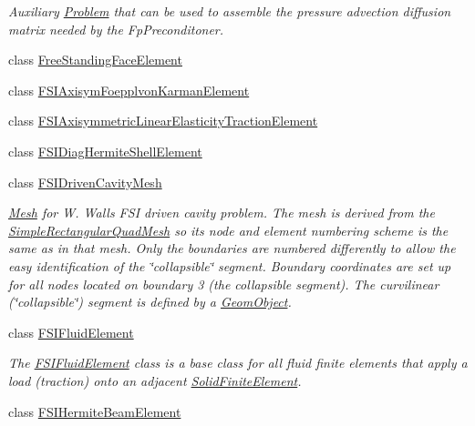 \begin{DoxyCompactItemize}
\begin{DoxyCompactList}\small\item\em Auxiliary \hyperlink{classoomph_1_1Problem}{Problem} that can be used to assemble the pressure advection diffusion matrix needed by the Fp\+Preconditoner. \end{DoxyCompactList}\item 
class \hyperlink{classoomph_1_1FreeStandingFaceElement}{Free\+Standing\+Face\+Element}
\item 
class \hyperlink{classoomph_1_1FSIAxisymFoepplvonKarmanElement}{F\+S\+I\+Axisym\+Foepplvon\+Karman\+Element}
\item 
class \hyperlink{classoomph_1_1FSIAxisymmetricLinearElasticityTractionElement}{F\+S\+I\+Axisymmetric\+Linear\+Elasticity\+Traction\+Element}
\item 
class \hyperlink{classoomph_1_1FSIDiagHermiteShellElement}{F\+S\+I\+Diag\+Hermite\+Shell\+Element}
\item 
class \hyperlink{classoomph_1_1FSIDrivenCavityMesh}{F\+S\+I\+Driven\+Cavity\+Mesh}
\begin{DoxyCompactList}\small\item\em \hyperlink{classoomph_1_1Mesh}{Mesh} for W. Wall\textquotesingle{}s F\+SI driven cavity problem. The mesh is derived from the {\ttfamily \hyperlink{classoomph_1_1SimpleRectangularQuadMesh}{Simple\+Rectangular\+Quad\+Mesh}} so it\textquotesingle{}s node and element numbering scheme is the same as in that mesh. Only the boundaries are numbered differently to allow the easy identification of the \char`\"{}collapsible\char`\"{} segment. Boundary coordinates are set up for all nodes located on boundary 3 (the collapsible segment). The curvilinear (\char`\"{}collapsible\char`\"{}) segment is defined by a {\ttfamily \hyperlink{classoomph_1_1GeomObject}{Geom\+Object}}. \end{DoxyCompactList}\item 
class \hyperlink{classoomph_1_1FSIFluidElement}{F\+S\+I\+Fluid\+Element}
\begin{DoxyCompactList}\small\item\em The \hyperlink{classoomph_1_1FSIFluidElement}{F\+S\+I\+Fluid\+Element} class is a base class for all fluid finite elements that apply a load (traction) onto an adjacent \hyperlink{classoomph_1_1SolidFiniteElement}{Solid\+Finite\+Element}. \end{DoxyCompactList}\item 
class \hyperlink{classoomph_1_1FSIHermiteBeamElement}{F\+S\+I\+Hermite\+Beam\+Element}

\end{DoxyCompactItemize}
